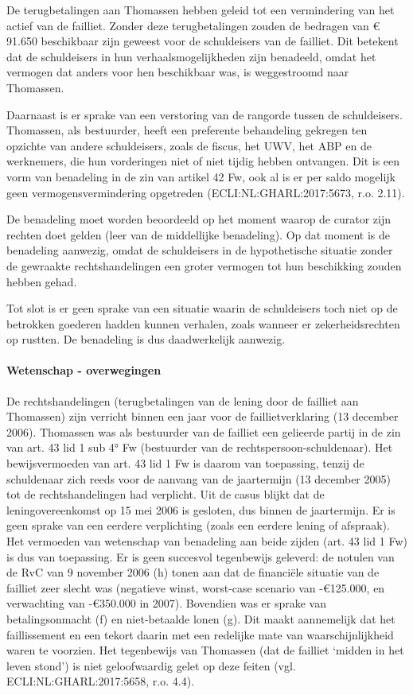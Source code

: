 \documentclass[
  dutch,
  a4paper,
]{article}
\begin{document}
De terugbetalingen aan Thomassen hebben geleid tot een vermindering van het actief van de failliet. Zonder deze terugbetalingen zouden de bedragen van € 91.650 beschikbaar zijn geweest voor de schuldeisers van de failliet. Dit betekent dat de schuldeisers in hun verhaalsmogelijkheden zijn benadeeld, omdat het vermogen dat anders voor hen beschikbaar was, is weggestroomd naar Thomassen.

Daarnaast is er sprake van een verstoring van de rangorde tussen de schuldeisers. Thomassen, als bestuurder, heeft een preferente behandeling gekregen ten opzichte van andere schuldeisers, zoals de fiscus, het UWV, het ABP en de werknemers, die hun vorderingen niet of niet tijdig hebben ontvangen. Dit is een vorm van benadeling in de zin van artikel 42 Fw, ook al is er per saldo mogelijk geen vermogensvermindering opgetreden (ECLI:NL:GHARL:2017:5673, r.o. 2.11).

De benadeling moet worden beoordeeld op het moment waarop de curator zijn rechten doet gelden (leer van de middellijke benadeling). Op dat moment is de benadeling aanwezig, omdat de schuldeisers in de hypothetische situatie zonder de gewraakte rechtshandelingen een groter vermogen tot hun beschikking zouden hebben gehad.

Tot slot is er geen sprake van een situatie waarin de schuldeisers toch niet op de betrokken goederen hadden kunnen verhalen, zoals wanneer er zekerheidsrechten op rustten. De benadeling is dus daadwerkelijk aanwezig.

\paragraph{Wetenschap - overwegingen}\label{wetenschap---overwegingen-78}

De rechtshandelingen (terugbetalingen van de lening door de failliet aan Thomassen) zijn verricht binnen een jaar voor de faillietverklaring (13 december 2006). Thomassen was als bestuurder van de failliet een gelieerde partij in de zin van art. 43 lid 1 sub 4° Fw (bestuurder van de rechtspersoon-schuldenaar). Het bewijsvermoeden van art. 43 lid 1 Fw is daarom van toepassing, tenzij de schuldenaar zich reeds voor de aanvang van de jaartermijn (13 december 2005) tot de rechtshandelingen had verplicht. Uit de casus blijkt dat de leningovereenkomst op 15 mei 2006 is gesloten, dus binnen de jaartermijn. Er is geen sprake van een eerdere verplichting (zoals een eerdere lening of afspraak). Het vermoeden van wetenschap van benadeling aan beide zijden (art. 43 lid 1 Fw) is dus van toepassing. Er is geen succesvol tegenbewijs geleverd: de notulen van de RvC van 9 november 2006 (h) tonen aan dat de financiële situatie van de failliet zeer slecht was (negatieve winst, worst-case scenario van -€125.000, en verwachting van -€350.000 in 2007). Bovendien was er sprake van betalingsonmacht (f) en niet-betaalde lonen (g). Dit maakt aannemelijk dat het faillissement en een tekort daarin met een redelijke mate van waarschijnlijkheid waren te voorzien. Het tegenbewijs van Thomassen (dat de failliet `midden in het leven stond') is niet geloofwaardig gelet op deze feiten (vgl. ECLI:NL:GHARL:2017:5658, r.o. 4.4).
\end{document}
